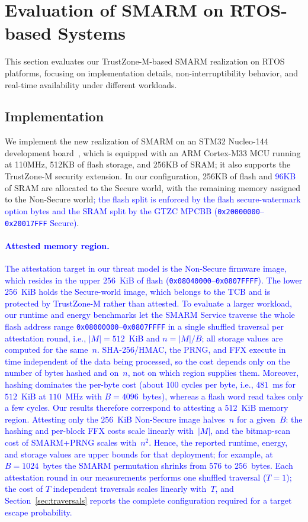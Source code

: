 \documentclass[journal]{IEEEtran}
\newcommand\ben[1]{\textcolor{blue}{#1}}
\newcommand{\rtsmarmone}{SMARM+PRNG\xspace}
\begin{document}
\section{Evaluation of SMARM on RTOS-based Systems}
\label{sec:evaluation}

This section evaluates our TrustZone-M-based SMARM realization on RTOS platforms, focusing on implementation details, non-interruptibility behavior, and real-time availability under different workloads.

\subsection{Implementation}

We implement the new realization of SMARM on an STM32 Nucleo-144 development board~\cite{stm32l552_nucleo144}, which is equipped with an ARM Cortex-M33 MCU running at 110MHz, 512KB of flash storage, and 256KB of SRAM;
it also supports the TrustZone-M security extension.
In our configuration, 256KB of flash and \ben{96KB} of SRAM are allocated to the Secure world, with the remaining memory assigned to the Non-Secure world\ben{; the flash split is enforced by the flash secure-watermark option bytes and the SRAM split by the GTZC MPCBB (\texttt{0x20000000}--\texttt{0x20017FFF} Secure)}.


\paragraph{\ben{Attested memory region.}}
\ben{The attestation target in our threat model is the Non-Secure firmware image, which resides in the upper $256$~KiB of flash (\texttt{0x08040000}--\texttt{0x0807FFFF}).
The lower $256$~KiB holds the Secure-world image, which belongs to the TCB and is protected by TrustZone-M rather than attested.
To evaluate a larger workload, our runtime and energy benchmarks let the SMARM Service traverse the whole flash address range \texttt{0x08000000}--\texttt{0x0807FFFF} in a single shuffled traversal per attestation round, i.e., $|M| = 512$~KiB and $n = |M|/B$; all storage values are computed for the same~$n$.
SHA-256/HMAC, the PRNG, and FFX execute in time independent of the data being processed, so the cost depends only on the number of bytes hashed and on~$n$, not on which region supplies them.
Moreover, hashing dominates the per-byte cost (about $100$ cycles per byte, i.e., $481$~ms for $512$~KiB at $110$~MHz with $B = 4096$~bytes), whereas a flash word read takes only a few cycles.
Our results therefore correspond to attesting a $512$~KiB memory region.
Attesting only the $256$~KiB Non-Secure image halves~$n$ for a given~$B$: the hashing and per-block FFX costs scale linearly with~$|M|$, and the bitmap-scan cost of \rtsmarmone scales with~$n^2$.
Hence, the reported runtime, energy, and storage values are upper bounds for that deployment; for example, at $B = 1024$~bytes the SMARM permutation shrinks from $576$ to $256$~bytes.
Each attestation round in our measurements performs one shuffled traversal ($T = 1$); the cost of $T$ independent traversals scales linearly with~$T$, and Section~\ref{sec:traversals} reports the complete configuration required for a target escape probability.}
\end{document}
